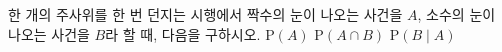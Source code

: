 한 개의 주사위를 한 번 던지는 시행에서 짝수의 눈이 나오는 사건을 $A$, 소수의 눈이 나오는 사건을 $B$라 할 때, 다음을 구하시오.
 $\mathrm{P}(A)$
 $\mathrm{P}(A\cap B)$
 $\mathrm{P}(B\mid A)$
